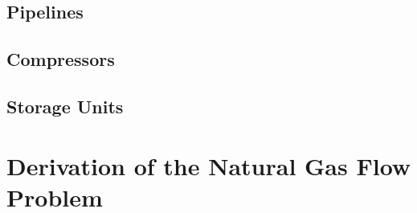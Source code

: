 \subsection{Pipelines}
\label{subsec:pipelines}

\subsection{Compressors}
\label{subsec:compressors}

\subsection{Storage Units}
\label{subsec:sto_units}



\section{Derivation of the Natural Gas Flow Problem}
\label{sec:NGF_problem}

